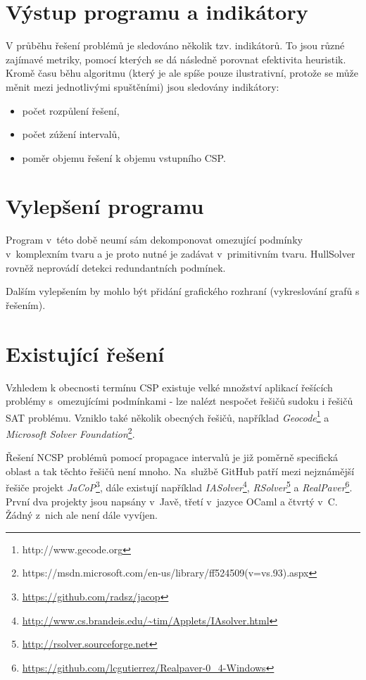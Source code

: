 \section{Výstup programu a indikátory}
\label{ch:indicators}
V průběhu řešení problémů je sledováno několik tzv. indikátorů. To jsou různé zajímavé metriky, pomocí kterých se dá následně porovnat efektivita heuristik. Kromě času běhu algoritmu (který je ale spíše pouze ilustrativní, protože se může měnit mezi jednotlivými spuštěními) jsou sledovány indikátory:

\begin{itemize}
    \item počet rozpůlení řešení,
    \item počet zúžení intervalů,
    \item poměr objemu řešení k objemu vstupního CSP.
\end{itemize}





\section{Vylepšení programu}
Program v~této době neumí sám dekomponovat omezující podmínky v~komplexním tvaru a je proto nutné je zadávat v~primitivním tvaru. HullSolver rovněž neprovádí detekci redundantních podmínek.

Dalším vylepšením by mohlo být přidání grafického rozhraní (vykreslování grafů s řešením).






\section{Existující řešení}
Vzhledem k obecnosti termínu CSP existuje velké množství aplikací řešících problémy s~omezujícími podmínkami - lze nalézt nespočet řešičů sudoku i řešičů SAT problému. Vzniklo také několik obecných řešičů, například \emph{Geocode}\footnote{http://www.gecode.org} a \emph{Microsoft Solver Foundation}\footnote{https://msdn.microsoft.com/en-us/library/ff524509(v=vs.93).aspx}.

Řešení NCSP problémů pomocí propagace intervalů je již poměrně specifická oblast a tak těchto řešičů není mnoho. Na~službě GitHub patří mezi nejznámější řešiče projekt \emph{JaCoP}\footnote{\url{https://github.com/radsz/jacop}}, dále existují například \emph{IASolver}\footnote{\url{http://www.cs.brandeis.edu/~tim/Applets/IAsolver.html}}, \emph{RSolver}\footnote{\url{http://rsolver.sourceforge.net}} a \emph{RealPaver}\footnote{\url{https://github.com/lcgutierrez/Realpaver-0\_4-Windows}}. První dva projekty jsou napsány v~Javě, třetí v~jazyce OCaml a čtvrtý v~C. Žádný z~nich ale není dále vyvíjen.
